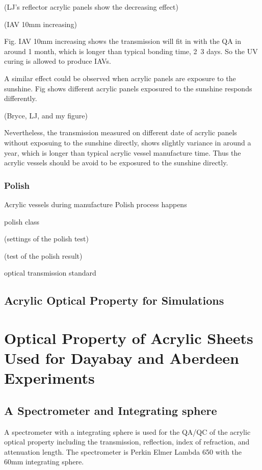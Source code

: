 (LJ's reflector acrylic panels show the decreasing effect)



(IAV 10mm increasing)


Fig. IAV 10mm increasing shows the transmission will fit in with the QA in around 1 month, which is longer than typical
bonding time, 2~3 days. So the UV curing is allowed to produce IAVs.

A similar effect could be observed when acrylic panels are exposure to the sunshine. Fig shows different
acrylic panels exposured to the sunshine responds differently.

(Bryce, LJ, and my figure)


Nevertheless, the transmission measured on different date of acrylic panels without exposuing to the sunshine directly,
shows slightly variance in around a year, which is longer than typical acrylic vessel manufacture time.
Thus the acrylic vessels should be avoid to be exposured to the sunshine directly.


\subsubsection {Polish}

Acrylic vessels during manufacture 
Polish process happens




polish class

(settings of the polish test)

(test of the polish result)


optical transmission standard


\subsection {Acrylic Optical Property for Simulations}

\section {Optical Property of Acrylic Sheets Used for Dayabay and Aberdeen Experiments}

\subsection {A Spectrometer and Integrating sphere}

A spectrometer with a integrating sphere is used for the QA/QC
of the acrylic optical property including
the transmission, reflection, index of refraction, and attenuation length.
The spectrometer is Perkin Elmer Lambda 650 with the 60mm integrating sphere.

